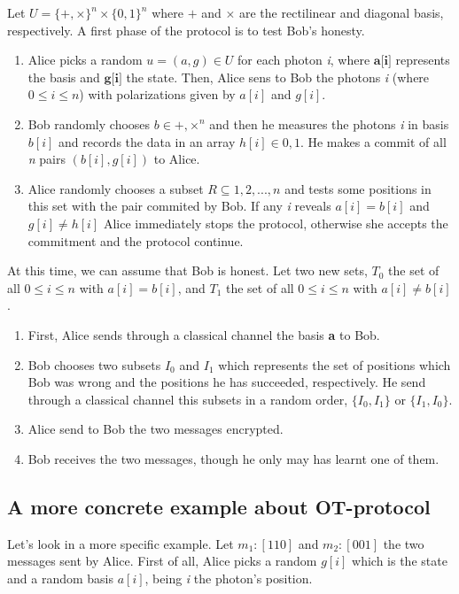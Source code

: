 Let $U=\{+,\times\}^{n} \times \{0,1\}^{n}$ where $+$ and $\times$ are the rectilinear and diagonal basis, respectively.
A first phase of the protocol is to test Bob's honesty.
\begin{enumerate}
	\item{Alice picks a random $u=(a,g) \in U$ for each photon \textit{i}, where $\textbf{a[i]}$ represents the basis and $\textbf{g[i]}$ the state. Then, Alice sens to Bob the photons \textit{i} (where $0\le i \le n$) with polarizations given by $a[i]$ and $g[i]$.}
	\item{Bob randomly chooses $b \in {+, \times}^{n}$ and then he measures the photons \textit{i} in basis $b[i]$ and records the data in an array $h[i] \in {0,1}$. He makes a commit of all \textit{n} pairs $(b[i],g[i])$ to Alice.}
	\item{Alice randomly chooses a subset $R \subseteq {1,2,...,n}$ and tests some positions in this set with  the pair commited by Bob. If any \textit{i} reveals $a[i]=b[i]$ and $g[i] \neq h[i]$ Alice immediately stops the protocol, otherwise she accepts the commitment and the protocol continue.}
\end{enumerate}

At this time, we can assume that Bob is honest. Let two new sets, $T_{0}$ the set of all $0\le i \le n$ with $a[i]=b[i]$, and $T_{1}$ the set of all  $0\le i \le n$ with $a[i]\neq b[i]$.
\begin{enumerate}
	\item{First, Alice sends through a classical channel the basis \textbf{a} to Bob.}
	\item{Bob chooses two subsets $I_{0}$ and $I_{1}$ which represents the set of positions which Bob was wrong and the positions he has succeeded, respectively. He send through a classical channel this subsets in a random order, $\{ I_{0},I_{1} \}$ or $\{ I_{1},I_{0} \}$.}
	\item{Alice send to Bob the two messages encrypted.}
	\item{Bob receives the two messages, though he only may has learnt one of them.}
\end{enumerate}

\subsection{A more concrete example about OT-protocol}

Let's look in a more specific example. Let $m_{1}: [1 1 0]$ and $m_{2}:[0 0 1]$ the two messages sent by Alice. First of all, Alice picks a random $g[i]$ which is the state and a random basis $a[i]$, being \textit{i} the photon's position.

